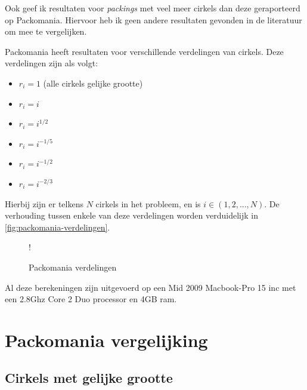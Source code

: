 \documentclass[12pt,a4paper,oneside]{book}
\begin{document}
{Ook geef ik resultaten voor \textit{packings} met veel meer cirkels dan deze geraporteerd op Packomania.
Hiervoor heb ik geen andere resultaten gevonden in de literatuur om mee te vergelijken.

Packomania heeft resultaten voor verschillende verdelingen van cirkels.
Deze verdelingen zijn als volgt:

\begin{itemize}
	\item $r_i=1$ (alle cirkels gelijke grootte)
	\item $r_i=i$
	\item $r_i=i^{1/2}$
	\item $r_i=i^{-1/5}$
	\item $r_i=i^{-1/2}$
	\item $r_i=i^{-2/3}$
\end{itemize}

Hierbij zijn er telkens $N$ cirkels in het probleem, en is $i \in (1,2,...,N)$.
De verhouding tussen enkele van deze verdelingen worden verduidelijk in \autoref{fig:packomania-verdelingen}.

\begin {figure}
	\centering
	 {!} {
	}
	\caption{Packomania verdelingen}
	\label{fig:packomania-verdelingen}
\end {figure}

Al deze berekeningen zijn uitgevoerd op een Mid 2009 Macbook-Pro 15 inc met een 2.8Ghz Core 2 Duo processor en 4GB ram.

\section{Packomania vergelijking}

\subsection{Cirkels met gelijke grootte}

}
\end{document}
